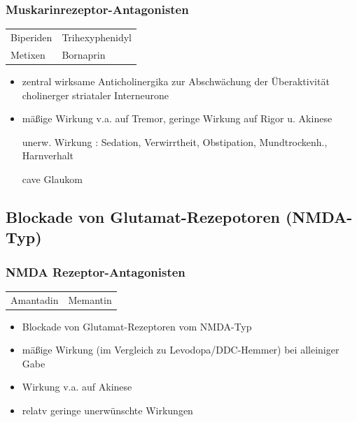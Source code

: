 \documentclass[10pt,a4paper]{report}
\begin{document}
\subsubsection{Muskarinrezeptor-Antagonisten} %
\label{ssub:muskarinrezeptor_antagonisten}
\begin{tabularx}{\textwidth}{XX}
Biperiden&Trihexyphenidyl\\
Metixen&Bornaprin\\
\end{tabularx}
\begin{itemize}
	\item zentral wirksame Anticholinergika zur Abschwächung der Überaktivität cholinerger striataler Interneurone
	\item mäßige Wirkung v.a. auf Tremor, geringe Wirkung auf Rigor u. Akinese 
	\item[unerw. Wirkung]: Sedation, Verwirrtheit, Obstipation, Mundtrockenh., Harnverhalt
	\item[cave] Glaukom
\end{itemize}
\subsection{Blockade von Glutamat-Rezepotoren (NMDA-Typ)} %
\label{sub:blockade_von_glutamat_rezepotoren_}
\subsubsection{NMDA Rezeptor-Antagonisten} %
\label{ssub:nmda_rezeptor_antagonisten}
\begin{tabularx}{\textwidth}{XX}
Amantadin&Memantin\\
\end{tabularx}
\begin{itemize}
	\item Blockade von Glutamat-Rezeptoren vom NMDA-Typ
	\item mäßige Wirkung (im Vergleich zu Levodopa/DDC-Hemmer) bei alleiniger Gabe
	\item Wirkung v.a. auf Akinese  
	\item relatv geringe unerwünschte Wirkungen
\end{itemize}
\end{document}
